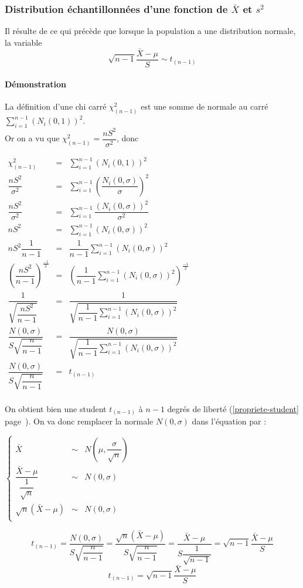 \newpage
\subsubsection{Distribution échantillonnées d'une fonction de $\bar{X}$ et $s^2$}
Il résulte de ce qui précède que lorsque la population a une distribution normale, la variable
$$\boxed{\sqrt{n-1}\dfrac{\bar{X}-\mu}{S} \sim t_{(n-1)}}$$
\paragraph{Démonstration} La définition d'une chi carré $\chi^2_{(n-1)}$ est une somme de normale au carré $\displaystyle\sum_{i=1}^{n-1} (N_i(0,1))^2$.\\Or on a vu que $\chi^2_{(n-1)} = \dfrac{nS^2}{\sigma^2}$, donc
\begin{center}
	$\begin{array}{LCL}
		\chi^2_{(n-1)} &=& \sum_{i=1}^{n-1} (N_i(0,1))^2\\
		\dfrac{nS^2}{\sigma^2} &=& \sum_{i=1}^{n-1} \left(\dfrac{N_i(0,\sigma)}{\sigma}\right)^2\\
		\dfrac{nS^2}{\sigma^2} &=& \sum_{i=1}^{n-1} \dfrac{(N_i(0,\sigma))^2}{\sigma^2}\\
		nS^2 &=& \sum_{i=1}^{n-1} (N_i(0,\sigma))^2\\
		nS^2 \dfrac{1}{n-1}&=& \dfrac{1}{n-1} \sum_{i=1}^{n-1} (N_i(0,\sigma))^2\\
		\left(\dfrac{nS^2}{n-1}\right)^{\frac{-1}{2}} &=& \left(\dfrac{1}{n-1} \sum_{i=1}^{n-1} (N_i(0,\sigma))^2 \right)^{\frac{-1}{2}}\\
		\dfrac{1}{\sqrt{\dfrac{nS^2}{n-1}}} &=& \dfrac{1}{\sqrt{\dfrac{1}{n-1} \displaystyle\sum_{i=1}^{n-1} (N_i(0,\sigma))^2}}\\
		\dfrac{N(0,\sigma)}{S\sqrt{\dfrac{n}{n-1}}} &=& \dfrac{N(0,\sigma)}{\sqrt{\dfrac{1}{n-1} \displaystyle\sum_{i=1}^{n-1} (N_i(0,\sigma))^2}}\\
		\dfrac{N(0,\sigma)}{S\sqrt{\dfrac{n}{n-1}}} &=& t_{(n-1)}\\
	\end{array}$
\end{center}
On obtient bien une student $t_{(n-1)}$ à $n-1$ degrés de liberté (\ref{propriete-student} page~\pageref{propriete-student}). On va donc remplacer la normale $N(0,\sigma)$ dans l'équation par :
\begin{center}
	$\left\{\begin{array}{LCLL}
		\bar{X} &\sim& N\left(\mu,\dfrac{\sigma}{\sqrt{n}}\right)\\
		\dfrac{\bar{X}-\mu}{\dfrac{1}{\sqrt{n}}} &\sim& N(0,\sigma)\\
		\sqrt{n}\left(\bar{X}-\mu\right) &\sim& N(0,\sigma)\\
	\end{array}\right.$
\end{center}
$$t_{(n-1)} = \dfrac{N(0,\sigma)}{S\sqrt{\dfrac{n}{n-1}}} = \dfrac{\sqrt{n}\left(\bar{X}-\mu\right)}{S\sqrt{\dfrac{n}{n-1}}} = \dfrac{\bar{X}-\mu}{S\dfrac{1}{\sqrt{n-1}}} = \sqrt{n-1}\dfrac{\bar{X}-\mu}{S}$$
$$\boxed{t_{(n-1)} = \sqrt{n-1}\dfrac{\bar{X}-\mu}{S}}$$